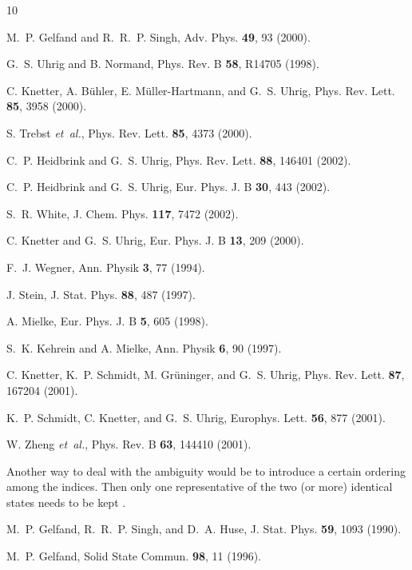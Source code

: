 %
%

\begin{thebibliography}{10}

M.~P. Gelfand and R.~R.~P. Singh, Adv. Phys. {\bf 49},  93  (2000).

G.~S. Uhrig and B. Normand, Phys. Rev. B {\bf 58},  R14705  (1998).

C. Knetter, A. B\"uhler, E. M\"uller-Hartmann, and G.~S. Uhrig, Phys. Rev.
  Lett. {\bf 85},  3958  (2000).

S. Trebst {\it et~al.}, Phys. Rev. Lett. {\bf 85},  4373  (2000).

C.~P. Heidbrink and G.~S. Uhrig, Phys. Rev. Lett. {\bf 88},  146401  (2002).

C.~P. Heidbrink and G.~S. Uhrig, Eur. Phys. J. B {\bf 30},  443  (2002).

S.~R. White, J. Chem. Phys. {\bf 117},  7472  (2002).

C. Knetter and G.~S. Uhrig, Eur. Phys. J. B {\bf 13},  209  (2000).

F.~J. Wegner, Ann. Physik {\bf 3},  77  (1994).

J. Stein, J. Stat. Phys. {\bf 88},  487  (1997).

A. Mielke, Eur. Phys. J. B {\bf 5},  605  (1998).

S.~K. Kehrein and A. Mielke, Ann. Physik {\bf 6},  90  (1997).

C. Knetter, K.~P. Schmidt, M. Gr\"uninger, and G.~S. Uhrig, Phys. Rev. Lett.
  {\bf 87},  167204  (2001).

K.~P. Schmidt, C. Knetter, and G.~S. Uhrig, Europhys. Lett. {\bf 56},  877
  (2001).

W. Zheng {\it et~al.}, Phys. Rev. B {\bf 63},  144410  (2001).

Another way to deal with
the ambiguity would be to introduce a certain ordering among the indices. Then
only one representative of the two (or more) identical states needs to be kept 
\protect\cite{knett00b,knett01b}.

M.~P. Gelfand, R.~R.~P. Singh, and D.~A. Huse, J. Stat. Phys. {\bf 59},  1093
  (1990).

M.~P. Gelfand, Solid State Commun. {\bf 98},  11  (1996).


\end{thebibliography}
